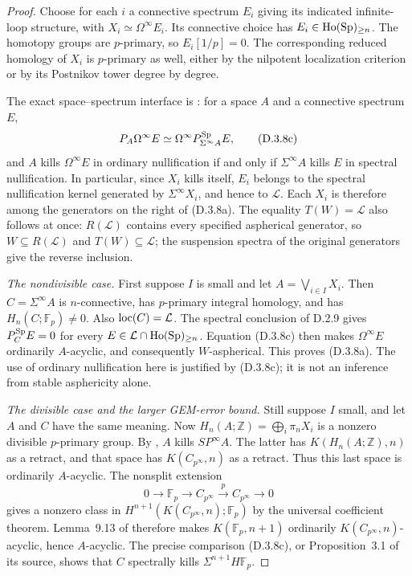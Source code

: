 \begin{proof}
Choose for each $i$ a connective spectrum $E_i$ giving its indicated
infinite-loop structure, with $X_i\simeq\Omega^\infty E_i$.
Its connective choice has $E_i\in\operatorname{Ho}(\mathrm{Sp})_{\geq n}$.
The homotopy groups are $p$-primary, so $E_i[1/p]=0$.
The corresponding reduced homology of $X_i$ is $p$-primary as
well, either by the nilpotent localization criterion or by its
Postnikov tower degree by degree.

The exact space--spectrum interface is
\citet[Theorem~2.10 and Proposition~3.1]{Bousfield1996ULP}:
for a space $A$ and a connective spectrum $E$,
\[
 P_A\Omega^\infty E\simeq
          \Omega^\infty P_{\Sigma^\infty A}^{\mathrm{Sp}}E,
 \tag{D.3.8c}
\]
and $A$ kills $\Omega^\infty E$ in ordinary nullification if and
only if $\Sigma^\infty A$ kills $E$ in spectral nullification.
In particular, since $X_i$ kills itself, $E_i$ belongs to the
spectral nullification kernel generated by $\Sigma^\infty X_i$,
and hence to $\mathcal L$. Each $X_i$ is therefore among the
generators on the right of (D.3.8a). The equality
$T(W)=\mathcal L$ also follows at once: $R(\mathcal L)$ contains
every specified aspherical generator, so
$W\subseteq R(\mathcal L)$ and $T(W)\subseteq\mathcal L$;
the suspension spectra of the original generators give the
reverse inclusion.

\medskip\noindent
\emph{The nondivisible case.}
First suppose $I$ is small and let $A=\bigvee_{i\in I}X_i$.
Then $C=\Sigma^\infty A$ is $n$-connective, has $p$-primary
integral homology, and has $H_n(C;\mathbb F_p)\ne0$.
Also $\operatorname{loc}(C)=\mathcal L$.
The spectral conclusion of D.2.9 gives
$P_C^{\mathrm{Sp}}E=0$ for every
$E\in\mathcal L\cap\operatorname{Ho}(\mathrm{Sp})_{\geq n}$.
Equation (D.3.8c) then makes $\Omega^\infty E$ ordinarily
$A$-acyclic, and consequently $W$-aspherical. This proves
(D.3.8a). The use of ordinary nullification here is justified
by (D.3.8c); it is not an inference from stable asphericity alone.

\medskip\noindent
\emph{The divisible case and the larger GEM-error bound.}
Still suppose $I$ small, and let $A$ and $C$ have the same meaning.
Now $H_n(A;\mathbb Z)=\bigoplus_i\pi_nX_i$ is a nonzero
divisible $p$-primary group. By
\citet[Corollary~3.2]{Bousfield1996ULP}, $A$ kills $SP^\infty A$.
The latter has $K(H_n(A;\mathbb Z),n)$ as a retract, and that
space has $K(C_{p^\infty},n)$ as a retract. Thus this last
space is ordinarily $A$-acyclic. The nonsplit extension
\[
 0\longrightarrow\mathbb F_p\longrightarrow C_{p^\infty}
       \xrightarrow{p}C_{p^\infty}\longrightarrow0
\]
gives a nonzero class in
$H^{n+1}(K(C_{p^\infty},n);\mathbb F_p)$ by the universal
coefficient theorem. Lemma~9.13 of
\citet{EH5Bousfield1997} therefore makes
$K(\mathbb F_p,n+1)$ ordinarily
$K(C_{p^\infty},n)$-acyclic, hence $A$-acyclic.
The precise comparison (D.3.8c), or Proposition~3.1 of its source,
shows that $C$ spectrally kills $\Sigma^{n+1}H\mathbb F_p$.


\end{proof}
